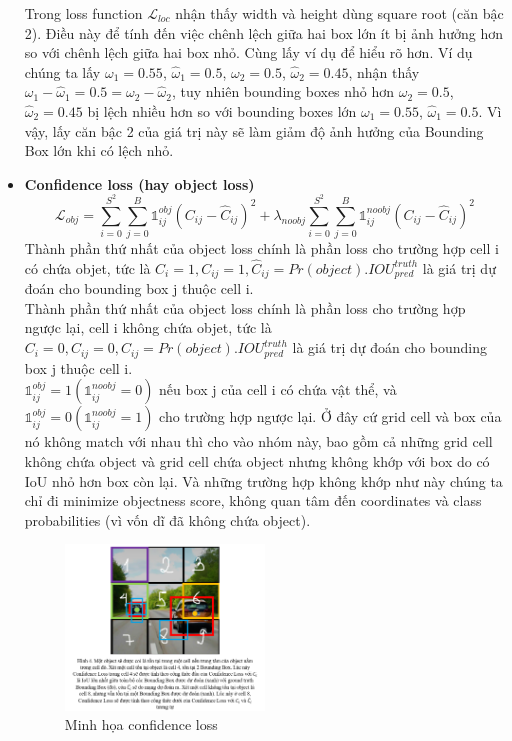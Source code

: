 \begin{itemize}
Trong loss function $\mathcal{L}_{loc}$ nhận thấy width và height dùng square root (căn bậc 2). Điều này để tính đến việc chênh lệch giữa hai box lớn ít bị ảnh hưởng hơn so với chênh lệch giữa hai box nhỏ. Cùng lấy ví dụ để hiểu rõ hơn. Ví dụ chúng ta lấy $\omega_1 = 0.55$, $\hat{\omega}_1 = 0.5$, $\omega_2 = 0.5$, $\hat{\omega}_2 = 0.45$, nhận thấy $\omega_1 - \hat{\omega}_1 = 0.5 = \omega_2 -\hat{\omega}_2$, tuy nhiên bounding boxes nhỏ hơn $\omega_2 = 0.5$, $\hat{\omega}_2 = 0.45$ bị lệch nhiều hơn so với bounding boxes lớn $\omega_1 = 0.55$, $\hat{\omega}_1 = 0.5$. Vì vậy, lấy căn bậc 2 của giá trị này sẽ làm giảm độ ảnh hưởng của Bounding Box lớn khi có lệch nhỏ. 
    \item \textbf{Confidence loss (hay object loss)}
    \begin{equation*}
        \mathcal{L}_{obj} = {\sum_{i=0}^{S^2} \sum_{j=0}^B \mathds{1}_{ij}^{obj} (C_{ij} - \hat{C}_{ij})^2} +\lambda_{noobj}{\sum_{i=0}^{S^2} \sum_{j=0}^B \mathds{1}_{ij}^{noobj} (C_{ij} - \hat{C}_{ij})^2}
    \end{equation*}
Thành phần thứ nhất của object loss chính là phần loss cho trường hợp cell i có chứa objet, tức là $C_i = 1, C_{ij} = 1,\hat{C}_{ij} = Pr(object) . IOU_{pred}^{truth}$ là giá trị dự đoán cho bounding box j thuộc cell i.\\
Thành phần thứ nhất của object loss chính là phần loss cho trường hợp ngược lại, cell i không chứa objet, tức là $C_i = 0, C_{ij} = 0,\hat{C}_{ij} = Pr(object) . IOU_{pred}^{truth}$ là giá trị dự đoán cho bounding box j thuộc cell i.\\

$\mathds{1}_{ij}^{obj} = 1 (\mathds{1}_{ij}^{noobj} = 0)$ nếu box j của cell i có chứa vật thể, và $\mathds{1}_{ij}^{obj} = 0 (\mathds{1}_{ij}^{noobj} = 1)$ cho trường hợp ngược lại. Ở đây cứ grid cell và box của nó không match với nhau thì cho vào nhóm này, bao gồm cả những grid cell không chứa object và grid cell chứa object nhưng không khớp với box do có IoU nhỏ hơn box còn lại. Và những trường hợp không khớp như này chúng ta chỉ đi minimize objectness score, không quan tâm đến coordinates và class probabilities (vì vốn dĩ đã không chứa object).
\begin{figure}[htbp]
        \centering
        \includegraphics[width=0.5\textwidth]{images/2a-sign/L-loss3.png}
        \caption{Minh họa confidence loss}
\end{figure}


\end{itemize}
